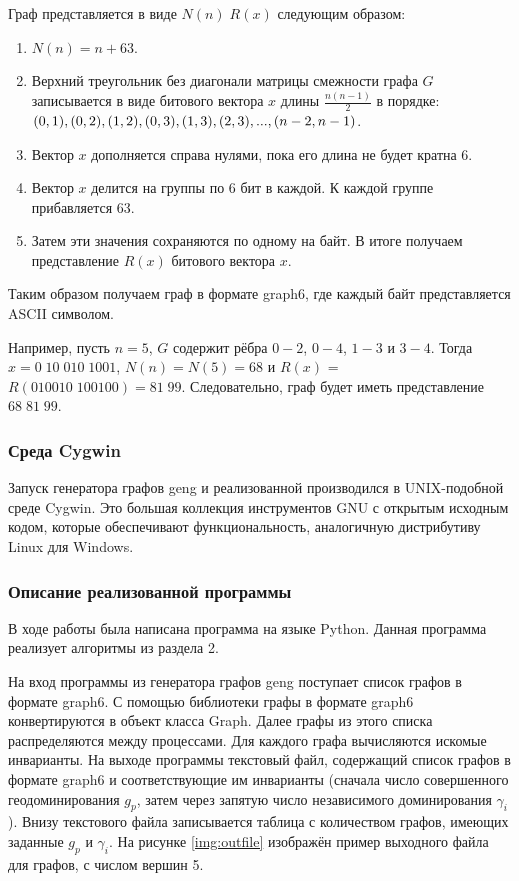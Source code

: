 \documentclass[bachelor, och, nir]{SCWorks}
\begin{document}
Граф представляется в виде $N(n) \; R(x)$ следующим образом:
\begin{enumerate}
    \item $N(n) = n + 63$.
    \item Верхний треугольник без диагонали
    матрицы смежности графа $G$ записывается в виде битового вектора $x$ длины $\frac{n (n - 1)}{2}$ в порядке:
    $(0,1),(0,2),\\(1,2),(0,3),(1,3),(2,3),...,(n-2,n-1)$. 
    \item Вектор $x$ дополняется справа нулями, пока его длина не будет кратна 6.
    \item Вектор $x$ делится на группы по 6 бит в каждой. К каждой группе прибавляется 63. 
    \item Затем эти значения сохраняются по одному на байт. В итоге получаем представление $R(x)$ битового вектора $x$.
\end{enumerate}
Таким образом получаем граф в формате graph6, где каждый байт представляется ASCII символом.

Например, пусть $n = 5$, $G$ содержит рёбра $0-2$, $0-4$, $1-3$ и $3-4$.
Тогда $x = 0 \; 10 \; 010 \; 1001$, $N(n) = N(5) = 68$ и $R(x)$ = $R(010010 \; 100100) = 81 \; 99$.
Следовательно, граф будет иметь представление $68 \; 81 \; 99$.

\subsubsection{Среда Cygwin}
Запуск генератора графов geng и реализованной производился в UNIX-подобной среде Cygwin.
Это большая коллекция инструментов GNU с открытым исходным кодом, которые обеспечивают функциональность, аналогичную дистрибутиву Linux для Windows.

\subsubsection{Описание реализованной программы}
В ходе работы была написана программа на языке Python.
Данная программа реализует алгоритмы из раздела 2.

На вход программы из генератора графов geng поступает список графов в формате graph6. 
С помощью библиотеки графы в формате graph6 конвертируются в объект класса Graph. 
Далее графы из этого списка распределяются между процессами. Для каждого графа вычисляются искомые инварианты.
На выходе программы текстовый файл, содержащий список графов в формате graph6 и соответствующие им инварианты (сначала число совершенного геодоминирования $g_p$, затем через запятую число независимого доминирования $\gamma_i$). Внизу текстового файла записывается таблица с количеством графов, имеющих заданные $g_p$ и $\gamma_i$. На рисунке \ref{img:outfile} изображён пример выходного файла для графов, с числом вершин 5.
\end{document}
